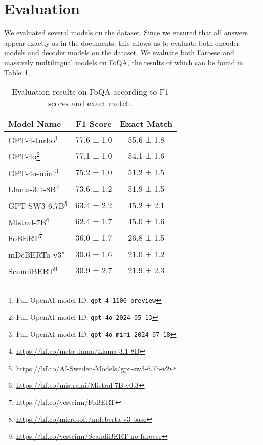 \documentclass[11pt]{article}
\begin{document}
\section{Evaluation}
\label{sec:evaluation}

We evaluated several models on the dataset. Since we ensured that all answers appear
exactly as in the documents, this allows us to evaluate both encoder models and decoder
models on the dataset. We evaluate both Faroese and massively multilingual models on
FoQA, the results of which can be found in Table~\ref{tab:results}.

\begin{savenotes}
    \begin{table}
        \centering
        \small
        \begin{tabular}{l|cc}
            \textbf{Model Name} & \textbf{F1 Score} & \textbf{Exact Match} \\
            \midrule
            GPT-4-turbo\footnote{Full OpenAI model ID: \texttt{gpt-4-1106-preview}} & 77.6 ± 1.0 & 55.6 ± 1.8 \\
            GPT-4o\footnote{Full OpenAI model ID: \texttt{gpt-4o-2024-05-13}} & 77.1 ± 1.0 & 54.1 ± 1.6 \\
            GPT-4o-mini\footnote{Full OpenAI model ID: \texttt{gpt-4o-mini-2024-07-18}} & 75.2 ± 1.0 & 51.2 ± 1.5 \\
            Llama-3.1-8B\footnote{\url{https://hf.co/meta-llama/Llama-3.1-8B}} & 73.6 ± 1.2 & 51.9 ± 1.5 \\
            GPT-SW3-6.7B\footnote{\url{https://hf.co/AI-Sweden-Models/gpt-sw3-6.7b-v2}} & 63.4 ± 2.2 & 45.2 ± 2.1 \\
            Mistral-7B\footnote{\url{https://hf.co/mistralai/Mistral-7B-v0.3}} & 62.4 ± 1.7 & 45.0 ± 1.6 \\
            FoBERT\footnote{\url{https://hf.co/vesteinn/FoBERT}} & 36.0 ± 1.7 & 26.8 ± 1.5 \\
            mDeBERTa-v3\footnote{\url{https://hf.co/microsoft/mdeberta-v3-base}} & 30.6 ± 1.6 & 21.0 ± 1.2 \\
            ScandiBERT\footnote{\url{https://hf.co/vesteinn/ScandiBERT-no-faroese}} & 30.9 ± 2.7 & 21.9 ± 2.3 \\
        \end{tabular}
        \caption{Evaluation results on FoQA according to F1 scores and exact match.}
        \label{tab:results}
    \end{table}
\end{savenotes}
\end{document}
